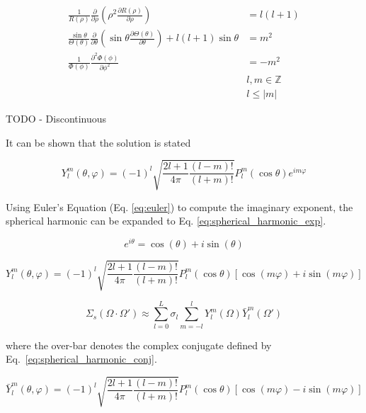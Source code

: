 \documentclass{article}
\numberwithin{equation}{subsection}
\begin{document}
\begin{equation}\label{eq_spherical_sep2}
\begin{split}
\frac{1}{R(\rho)}
\frac{\partial}{\partial \rho} 
\left( \rho^2 \frac{\partial R(\rho)}{\partial \rho}\right) 
&= l(l+1) \\
\frac{\sin \theta}{\Theta(\theta)}
\frac{\partial}{\partial \theta}
\left( \sin \theta \frac{\partial \Theta(\theta)}{\partial \theta}\right) 
+ l(l+1) \sin \theta
&= m^2 \\
\frac{1}{\Phi(\phi)} 
\frac{\partial^2 \Phi(\phi)}{\partial \phi^2}
&= -m^2 \\
& l, m \in \mathbb{Z} \\
& l \leq |m|
\end{split}
\end{equation}

TODO - Discontinuous

It can be shown that the solution is stated

\begin{equation}\label{eq:spherical_harmonic}
Y_l^m(\theta, \varphi) = (-1)^{l}\sqrt{\frac{2l+1}{4 \pi}
\frac{(l-m)!}{(l+m)!}} P_l^m(\cos \theta) e^{im \varphi}
\end{equation}

Using Euler's Equation (Eq. \ref{eq:euler}) to compute the imaginary exponent, the spherical harmonic can be expanded to Eq. \ref{eq:spherical_harmonic_exp}.

\begin{equation}\label{eq:euler}
e^{i \theta} = \cos(\theta) + i \sin(\theta)
\end{equation}

\begin{equation}\label{eq:spherical_harmonic_exp}
Y_l^m(\theta, \varphi) = (-1)^{l}\sqrt{\frac{2l+1}{4 \pi}
\frac{(l-m)!}{(l+m)!}} P_l^m(\cos \theta) \left[ \cos(m \varphi) + i \sin(m \varphi) \right]
\end{equation}

\begin{equation}\label{eq:spherical_harmonic_xs}
\Sigma_s(\Omega \cdot \Omega') \approx \sum_{l=0}^L \sigma_l \sum_{m=-l}^l Y_l^m(\Omega)\bar{Y}_l^m(\Omega')
\end{equation}

where the over-bar denotes the complex conjugate defined by Eq.~\ref{eq:spherical_harmonic_conj}.

\begin{equation}\label{eq:spherical_harmonic_conj}
\bar{Y}_l^m(\theta, \varphi) = (-1)^{l}\sqrt{\frac{2l+1}{4 \pi}
\frac{(l-m)!}{(l+m)!}} P_l^m(\cos \theta) \left[ \cos(m \varphi) - i \sin(m \varphi) \right]
\end{equation}
\end{document}
